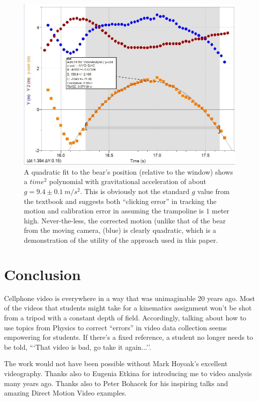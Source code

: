 \documentclass[prb,twocolumn]{revtex4-2}
\begin{document}
\begin{figure}[h]
\centering
\includegraphics[width=\columnwidth]{bear-quadratic.jpg}
\caption{
A quadratic fit to the bear's position (relative to the window) shows a $time^2$ polynomial with gravitational acceleration of about $g=9.4\pm 0.1~m/s^2$.  This is obviously not the standard $g$ value from the textbook and suggests both ``clicking error'' in tracking the motion and calibration error in assuming the trampoline is $1$ meter high.  Never-the-less, the corrected motion (unlike that of the bear from the moving camera, (blue) is clearly quadratic, which is a demonstration of the utility of the approach used in this paper.
}
\label{bear-quadratic}
\end{figure}

\section{Conclusion}
Cellphone video is everywhere in a way that was unimaginable 20 years ago.  Most of the videos that students might take for a kinematics assignment won't be shot from a tripod with a constant depth of field.  Accordingly, talking about how to use topics from Physics to correct ``errors'' in video data collection seems empowering for students.  If there's a fixed reference, a student no longer needs to be told, ```That video is bad, go take it again...''.

\begin{acknowledgments}
The work would not have been possible without Mark Hoyoak's excellent videography.  Thanks also to Eugenia Etkina for introducing me to video analysis many years ago.  Thanks also to Peter Bohacek for his inspiring talks and amazing Direct Motion Video examples.  

\end{acknowledgments}
\end{document}

